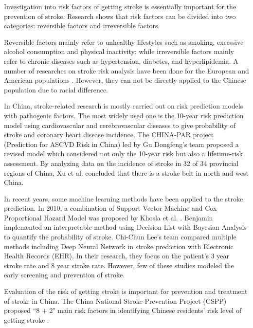 \documentclass{article}
\begin{document}
Investigation into risk factors of getting stroke is essentially important for the prevention of stroke. Research shows that risk factors can be divided into two categories: reversible factors and irreversible factors.

Reversible factors mainly refer to unhealthy lifestyles such as smoking, excessive alcohol consumption and physical inactivity; while irreversible factors mainly refer to chronic diseases such as hypertension, diabetes, and hyperlipidemia. A number of researches on stroke risk analysis have been done for the European and American populations \cite{vartiainen2016predicting, lumley2002stroke}. However, they can not be directly applied to the Chinese population due to racial difference. 

In China, stroke-related research is mostly carried out on risk prediction models with pathogenic factors. The most widely used one is the 10-year risk prediction model using cardiovascular and cerebrovascular diseases to give probability of stroke and coronary heart disease incidence. The CHINA-PAR project (Prediction for ASCVD Risk in China) led by Gu Dongfeng's team \cite{yang2016predicting} proposed a revised model which considered not only the 10-year risk but also a lifetime-risk assessment.  By analyzing  data on the incidence of stroke in 32 of 34 provincial regions of China, Xu et al. \cite{xu2013there}  concluded that there is  a stroke belt in north and west China. 


In recent years, some machine learning methods have been applied to the stroke prediction. In 2010, a combination of Support Vector Machine and Cox Proportional Hazard Model was proposed  by Khosla et al.  \cite{khosla2010integrated}. Benjamin \cite{letham2015interpretable} implemented an interpretable method using Decision List with Bayesian Analysis to quantify the probability of stroke. Chi-Chun Lee's team \cite{hung2017comparing, hung2019development} compared multiple methods including Deep Neural Network in stroke prediction with Electronic Health Records (EHR). In their research, they focus on the patient's 3 year stroke rate and 8 year stroke rate. However, few of these studies modeled the early screening and prevention of stroke. 

 Evaluation of the risk of getting stroke is important for prevention and treatment of stroke in China. The China National Stroke Prevention Project (CSPP)\label{project:CSPP} proposed ``8 + 2" main risk factors in identifying Chinese residents' risk level of getting stroke \cite{yu2016csdc, li2019using,chao2021stroke}:
\end{document}
